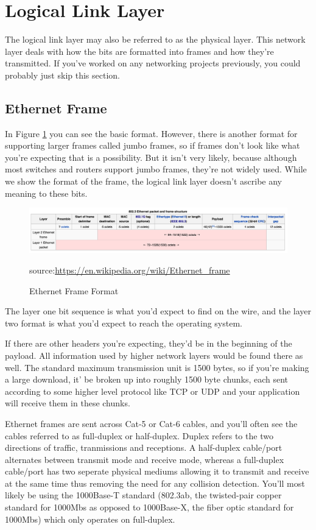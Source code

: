 \documentclass[12pt]{report}
\begin{document}
\section{Logical Link Layer}
The logical link layer may also be referred to as the physical layer.
This network layer deals with how the bits are formatted into frames and how they're transmitted.
If you've worked on any networking projects previously, you could probably just skip this section.

\subsection{Ethernet Frame}
In Figure \ref{fig:eframe} you can see the basic format. However, there is another format for supporting larger frames called jumbo frames, so if frames don't look like what you're expecting that is a possibility. But it isn't very likely, because although most switches and routers support jumbo frames, they're not widely used. While we show the format of the frame, the logical link layer doesn't ascribe any meaning to these bits.

\begin{figure}[!h]
\centering
\includegraphics[width=6in]{eframe}
\caption{Ethernet Frame Format}
\small source:\url{https://en.wikipedia.org/wiki/Ethernet_frame}
\label{fig:eframe}
\end{figure}

The layer one bit sequence is what you'd expect to find on the wire, and the layer two format is what you'd expect to reach the operating system.

If there are other headers you're expecting, they'd be in the beginning of the payload. All information used by higher network layers would be found there as well. The standard maximum transmission unit is 1500 bytes, so if you're making a large download, it' be broken up into roughly 1500 byte chunks, each sent according to some higher level protocol like TCP or UDP and your application will receive them in these chunks.

Ethernet frames are sent across Cat-5 or Cat-6 cables, and you'll often see the cables referred to as full-duplex or half-duplex. Duplex refers to the two directions of traffic, tranmissions and receptions. A half-duplex cable/port alternates between transmit mode and receive mode, whereas a full-duplex cable/port has two seperate physical mediums allowing it to transmit and receive at the same time thus removing the need for any collision detection. You'll most likely be using the 1000Base-T standard (802.3ab, the twisted-pair copper standard for 1000Mbs as opposed to 1000Base-X, the fiber optic standard for 1000Mbs) which only operates on full-duplex.
\end{document}
